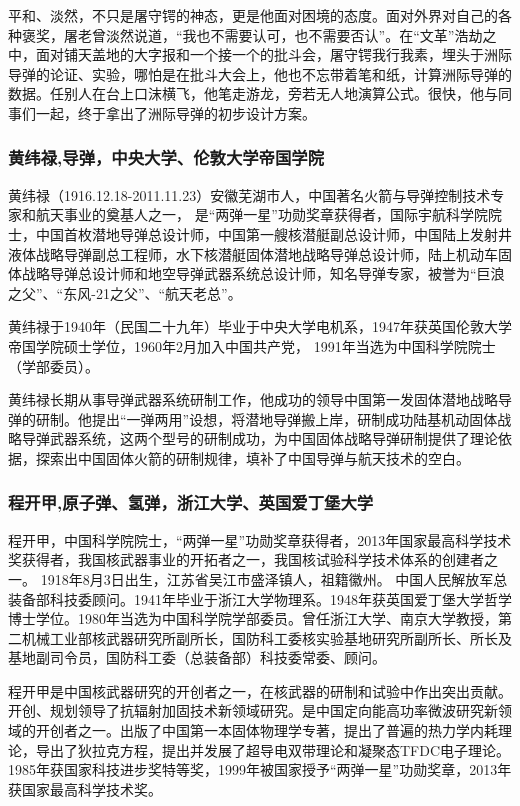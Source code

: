 \documentclass[UTF8]{ctexart}
\begin{document}
平和、淡然，不只是屠守锷的神态，更是他面对困境的态度。面对外界对自己的各种褒奖，屠老曾淡然说道，“我也不需要认可，也不需要否认”。在“文革”浩劫之中，面对铺天盖地的大字报和一个接一个的批斗会，屠守锷我行我素，埋头于洲际导弹的论证、实验，哪怕是在批斗大会上，他也不忘带着笔和纸，计算洲际导弹的数据。任别人在台上口沫横飞，他笔走游龙，旁若无人地演算公式。很快，他与同事们一起，终于拿出了洲际导弹的初步设计方案。
    \subsubsection{黄纬禄,导弹，中央大学、伦敦大学帝国学院}
黄纬禄（1916.12.18-2011.11.23）安徽芜湖市人，中国著名火箭与导弹控制技术专家和航天事业的奠基人之一， 是“两弹一星”功勋奖章获得者，国际宇航科学院院士，中国首枚潜地导弹总设计师，中国第一艘核潜艇副总设计师，中国陆上发射井液体战略导弹副总工程师，水下核潜艇固体潜地战略导弹总设计师，陆上机动车固体战略导弹总设计师和地空导弹武器系统总设计师，知名导弹专家，被誉为“巨浪之父”、“东风-21之父”、“航天老总”。 

黄纬禄于1940年（民国二十九年）毕业于中央大学电机系，1947年获英国伦敦大学帝国学院硕士学位，1960年2月加入中国共产党， 1991年当选为中国科学院院士（学部委员）。 

黄纬禄长期从事导弹武器系统研制工作，他成功的领导中国第一发固体潜地战略导弹的研制。他提出“一弹两用”设想，将潜地导弹搬上岸，研制成功陆基机动固体战略导弹武器系统，这两个型号的研制成功，为中国固体战略导弹研制提供了理论依据，探索出中国固体火箭的研制规律，填补了中国导弹与航天技术的空白。
    \subsubsection{程开甲,原子弹、氢弹，浙江大学、英国爱丁堡大学}
程开甲，中国科学院院士，“两弹一星”功勋奖章获得者，2013年国家最高科学技术奖获得者，我国核武器事业的开拓者之一，我国核试验科学技术体系的创建者之一。 1918年8月3日出生，江苏省吴江市盛泽镇人，祖籍徽州。 中国人民解放军总装备部科技委顾问。1941年毕业于浙江大学物理系。1948年获英国爱丁堡大学哲学博士学位。1980年当选为中国科学院学部委员。曾任浙江大学、南京大学教授，第二机械工业部核武器研究所副所长，国防科工委核实验基地研究所副所长、所长及基地副司令员，国防科工委（总装备部）科技委常委、顾问。 

程开甲是中国核武器研究的开创者之一，在核武器的研制和试验中作出突出贡献。开创、规划领导了抗辐射加固技术新领域研究。是中国定向能高功率微波研究新领域的开创者之一。出版了中国第一本固体物理学专著，提出了普遍的热力学内耗理论，导出了狄拉克方程，提出并发展了超导电双带理论和凝聚态TFDC电子理论。1985年获国家科技进步奖特等奖，1999年被国家授予“两弹一星”功勋奖章，2013年获国家最高科学技术奖。
\end{document}
